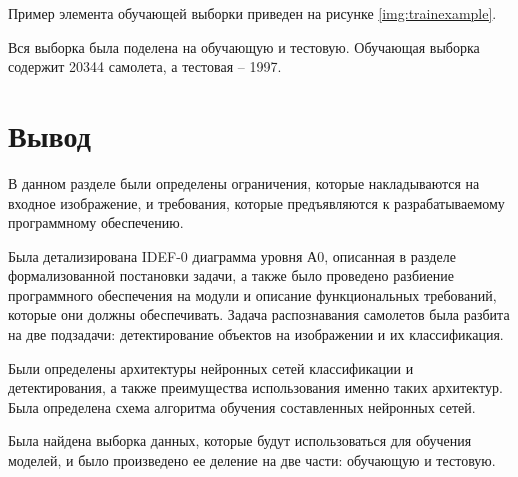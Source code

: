 Пример элемента обучающей выборки приведен на рисунке \ref{img:trainexample}.


Вся выборка была поделена на обучающую и тестовую. Обучающая выборка содержит 20344 самолета, а тестовая -- 1997.

\section{Вывод}

В данном разделе были определены ограничения, которые накладываются на входное изображение, и требования, которые предъявляются к разрабатываемому программному обеспечению.

Была детализирована IDEF-0 диаграмма уровня А0, описанная в разделе формализованной постановки задачи, а также было проведено разбиение программного обеспечения на модули и описание функциональных требований, которые они должны обеспечивать. Задача распознавания самолетов была разбита на две подзадачи: детектирование объектов на изображении и их классификация.

Были определены архитектуры нейронных сетей классификации и детектирования, а также преимущества использования именно таких архитектур. Была определена схема алгоритма обучения составленных нейронных сетей.

Была найдена выборка данных, которые будут использоваться для обучения моделей, и было произведено ее деление на две части: обучающую и тестовую.